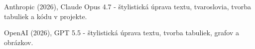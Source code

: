 \begin{trivlist}
\item Anthropic (2026), Claude Opus 4.7 - štylistická úprava textu, tvaroslovia, tvorba tabuliek a kódu v projekte.
\item OpenAI (2026), GPT 5.5 - štylistická úprava textu, tvorba tabuliek, grafov a obrázkov.
\end{trivlist}